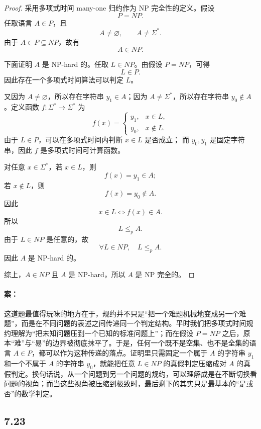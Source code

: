 \begin{answerred}
\begin{proof}
采用多项式时间 many-one 归约作为 NP 完全性的定义。假设
\[
P=NP.
\]
任取语言 $A\in P$，且
\[
A\neq \varnothing,\qquad A\neq \Sigma^*.
\]
由于 $A\in P\subseteq NP$，故有
\[
A\in NP.
\]

下面证明 $A$ 是 NP-hard 的。任取 $L\in NP$。由假设 $P=NP$，可得
\[
L\in P.
\]
因此存在一个多项式时间算法可以判定 $L$。

又因为 $A\neq\varnothing$，所以存在字符串 $y_1\in A$；因为
$A\neq\Sigma^*$，所以存在字符串 $y_0\notin A$。定义函数
$f:\Sigma^*\to\Sigma^*$ 为
\[
f(x)=
\begin{cases}
y_1, & x\in L,\\
y_0, & x\notin L.
\end{cases}
\]
由于 $L\in P$，可以在多项式时间内判断 $x\in L$ 是否成立；
而 $y_0,y_1$ 是固定字符串，因此 $f$ 是多项式时间可计算函数。

对任意 $x\in\Sigma^*$，若 $x\in L$，则
\[
f(x)=y_1\in A;
\]
若 $x\notin L$，则
\[
f(x)=y_0\notin A.
\]
因此
\[
x\in L \iff f(x)\in A.
\]
所以
\[
L\leq_p A.
\]
由于 $L\in NP$ 是任意的，故
\[
\forall L\in NP,\quad L\leq_p A.
\]
因此 $A$ 是 NP-hard 的。

综上，$A\in NP$ 且 $A$ 是 NP-hard，所以 $A$ 是 NP 完全的。
\end{proof}

\begin{answernote}
\paragraph{案：} 这道题最值得玩味的地方在于，规约并不只是“把一个难题机械地变成另一个难题”，而是在不同问题的表述之间传递同一个判定结构。平时我们把多项式时间规约理解为“把未知问题压到一个已知的标准问题上”；而在假设 $P=NP$ 之后，原本“难”与“易”的边界被彻底抹平了。于是，任何一个既不是空集、也不是全集的语言 $A\in P$，都可以作为这种传递的落点。证明里只需固定一个属于 $A$ 的字符串 $y_1$ 和一个不属于 $A$ 的字符串 $y_0$，就能把任意 $L\in NP$ 的真假判定压缩成对 $A$ 的真假判定。换句话说，从一个问题到另一个问题的规约，可以理解成是在不断切换看问题的视角；而当这些视角被压缩到极致时，最后剩下的其实只是最基本的“是或否”的数学判定。

\end{answernote}
\end{answerred}
\subsection*{7.23}

